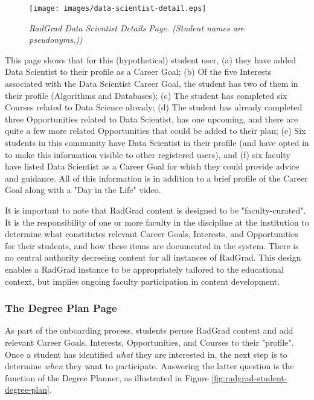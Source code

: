 \documentclass[acmsmall]{acmart}
\begin{document}
\begin{figure}[ht]
\centering
\texttt{[image: images/data-scientist-detail.eps]}
\caption{\em RadGrad Data Scientist Details Page. (Student names are pseudonyms.))}
\label{fig:radgrad-data-scientist-detail}
\end{figure}

This page shows that for this (hypothetical) student user, (a) they have added Data Scientist to their profile as a Career Goal; (b) Of the five Interests associated with the Data Scientist Career Goal, the student has two of them in their profile (Algorithms and Databases); (c) The student has completed six Courses related to Data Science already; (d) The student has already completed three Opportunities related to Data Scientist, has one upcoming, and there are quite a few more related Opportunities that could be added to their plan; (e) Six students in this community have Data Scientist in their profile (and have opted in to make this information visible to other registered users), and (f) six faculty have listed Data Scientist as a Career Goal for which they could provide advice and guidance.  All of this information is in addition to a brief profile of the Career Goal along with a "Day in the Life" video.

It is important to note that RadGrad content is designed to be "faculty-curated".  It is the responsibility of one or more faculty in the discipline at the institution to determine what constitutes relevant Career Goals, Interests, and Opportunities for their students, and how these items are documented in the system. There is no central authority decreeing content for all instances of RadGrad. This design enables a RadGrad instance to be appropriately tailored to the educational context, but implies ongoing faculty participation in content development.

\subsubsection{The Degree Plan Page}

As part of the onboarding process, students peruse RadGrad content and add relevant Career Goals, Interests, Opportunities, and Courses to their "profile".  Once a student has identified {\em what} they are interested in, the next step is to determine {\em when} they want to participate. Answering the latter question is the function of the Degree Planner, as illustrated in  Figure \ref{fig:radgrad-student-degree-plan}.
\end{document}
